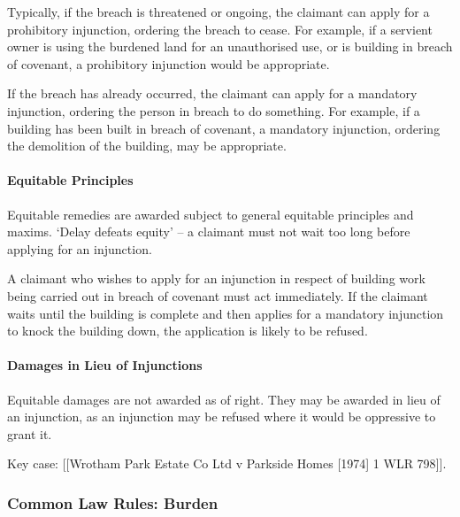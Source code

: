 \documentclass[
]{article}
\newenvironment{Shaded}{}{}
\newcommand{\NormalTok}[1]{#1}
\begin{document}
Typically, if the breach is threatened or ongoing, the claimant can
apply for a prohibitory injunction, ordering the breach to cease. For
example, if a servient owner is using the burdened land for an
unauthorised use, or is building in breach of covenant, a prohibitory
injunction would be appropriate.

If the breach has already occurred, the claimant can apply for a
mandatory injunction, ordering the person in breach to do something. For
example, if a building has been built in breach of covenant, a mandatory
injunction, ordering the demolition of the building, may be appropriate.

\hypertarget{equitable-principles}{%
\paragraph{Equitable Principles}\label{equitable-principles}}

Equitable remedies are awarded subject to general equitable principles
and maxims. `Delay defeats equity' -- a claimant must not wait too long
before applying for an injunction.

\begin{Shaded}
\begin{Highlighting}[]
\NormalTok{A claimant who wishes to apply for an injunction in respect of building work being carried out in breach of covenant must act immediately. If the claimant waits until the building is complete and then applies for a mandatory injunction to knock the building down, the application is likely to be refused.}
\end{Highlighting}
\end{Shaded}

\hypertarget{damages-in-lieu-of-injunctions}{%
\paragraph{Damages in Lieu of
Injunctions}\label{damages-in-lieu-of-injunctions}}

Equitable damages are not awarded as of right. They may be awarded in
lieu of an injunction, as an injunction may be refused where it would be
oppressive to grant it.

Key case: {[}{[}Wrotham Park Estate Co Ltd v Parkside Homes {[}1974{]} 1
WLR 798{]}{]}.

\hypertarget{common-law-rules-burden}{%
\subsubsection{Common Law Rules: Burden}\label{common-law-rules-burden}}
\end{document}

